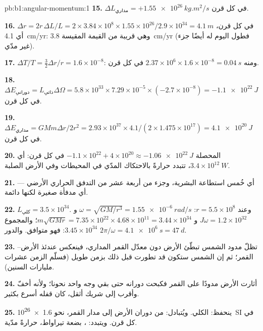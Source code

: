 \begin{solution}{pb:b1:angular-momentum:1}
\textbf{15.} $\Delta L_{\text{مداري}} = +\qty{1.55e26}{kg.m^2/s}$ في كل قرن.

\textbf{16.} $\Delta r = 2r\,\Delta L/L = 2 \times 3.84\times10^8 \times 1.55
\times10^{26}/2.9\times10^{34} = \qty{4.1}{m}$ في كل قرن، أي \qty{4.1}{cm/yr}:
وهي قريبة من القيمة المقيسة \qty{3.8}{cm/yr} (فطول اليوم له أيضًا
جزء غير مدّي).

\textbf{17.} $\Delta T/T = \tfrac32\Delta r/r = 1.6\times10^{-8}$: ومنه $2.37\times
10^6 \times 1.6\times10^{-8} = \qty{0.04}{s}$ في كل قرن.

\textbf{18.} $\Delta E_{\text{دوراني}} = L_{\text{ذاتي}}\Delta\Omega = 5.8\times10^{33}
\times 7.29\times10^{-5} \times (-2.7\times10^{-8}) = \qty{-1.1e22}{J}$ في كل
قرن.

\textbf{19.} $\Delta E_{\text{مداري}} = GMm\Delta r/2r^2 = 2.93\times10^{37}
\times 4.1/(2 \times 1.475\times10^{17}) = \qty{+4.1e20}{J}$ في كل قرن.

\textbf{20.} المحصلة $-1.1\times10^{22} + 4\times10^{20} \approx \qty{-1.06e22}{J}$
في كل قرن: أي $3.4\times10^{12}\ \unit{W}$، تتبدد حرارةً بالاحتكاك
المدّي في المحيطات وفي الأرض الصلبة.

\textbf{21.} أي خُمس استطاعة البشرية، وجزء من أربعة عشر من التدفق
الحراري الأرضي --- أي مدفأة صغيرة لكنها دائمة.

\textbf{22.} $L_{\text{كلي}} = 3.5\times10^{34}$. وعند $r = 5.5\times10^8$:
$\omega = \sqrt{GM/r^3} = \qty{1.55e-6}{rad/s}$ و $J\omega = 1.2\times10^{32}$ و
$m\sqrt{GMr} = 7.35\times10^{22} \times 4.68\times10^{11} = 3.44\times10^{34}$؛
والمجموع $3.45\times10^{34}$: فهو متوافق. والدور $2\pi/\omega = \qty{4.1e6}{s}
= \qty{47}{d}$.

\textbf{23.} تظلّ مدود الشمس تبطّئ الأرض دون معدّل القمر
المداري، فينعكس عندئذ  الأرض--القمر؛ ثم إن
الشمس ستكون قد تطورت قبل ذلك بزمن طويل (فسلّم الزمن عشرات
مليارات السنين).

\textbf{24.} أثارت الأرض مدودًا على القمر فكبحت دورانه
حتى بقي وجه واحد نحونا؛ ولأنه أخفّ وأقرب إلى شريك أثقل،
كان قفله أسرع بكثير.

\textbf{25.} ينحفظ:  الكلي. ويُتبادل: 
من دوران الأرض إلى مدار القمر، نحو \qty{1.6e26}{SI}
في كل قرن. ويتبدد: ، بضعة تيراواط، حرارةً
مدّية.
\end{solution}
